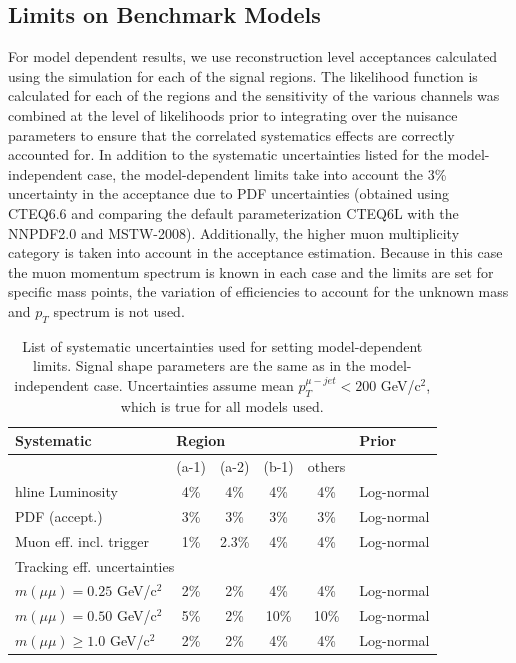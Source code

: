 \subsection{Limits on Benchmark Models}

For model dependent results, we use reconstruction level acceptances calculated using the simulation for each of the signal regions. The likelihood function is calculated for each of the regions and the sensitivity of the various channels was combined at the level of likelihoods prior to integrating over the nuisance parameters to ensure that the correlated systematics effects are correctly accounted for. In addition to the systematic uncertainties listed for the model-independent case, the model-dependent limits take into account the 3\% uncertainty in the acceptance due to PDF uncertainties (obtained using CTEQ6.6 and comparing the default parameterization CTEQ6L with the NNPDF2.0 and MSTW-2008). Additionally, the higher muon multiplicity category is taken into account in the acceptance estimation. Because in this case the muon momentum spectrum is known in each case and the limits are set for specific mass points, the variation of efficiencies to account for the unknown mass and $p_T$ spectrum is not used.

\begin{table}[tbh]
\caption{List of systematic uncertainties used for setting model-dependent limits. Signal shape parameters
are the same as in the model-independent case. Uncertainties assume mean $p_T^{\mu-jet}<200$ GeV/c$^2$,
which is true for all models used. \label{tab:syst_params_model_dependent}}
\begin{center}
\begin{tabular}{| l | cccc|l|}
\hline\hline 
Systematic & \multicolumn{4}{|l|}{Region}              & Prior \\\hline
                  & (a-1) & (a-2) & (b-1) & others & \\hline
Luminosity  & 4\%  & 4\% & 4\%  & 4\%     & Log-normal \\
PDF (accept.) & 3\%  & 3\% & 3\%  & 3\%      & Log-normal \\
Muon eff. incl. trigger & 1\%& 2.3\%& 4\% & 4\% & Log-normal \\\hline
\multicolumn{4}{|l|}{Tracking eff. uncertainties}  \\
$m(\mu\mu)=0.25$ GeV/c$^2$   & 2\% & 2\% & 4\%   & 4\%   & Log-normal \\
$m(\mu\mu)=0.50$ GeV/c$^2$   & 5\% & 2\% & 10\% & 10\%  & Log-normal \\
$m(\mu\mu)\geq1.0$ GeV/c$^2$ & 2\% & 2\% & 4\%  & 4\%   & Log-normal \\
\hline\hline 
\end{tabular}
\end{center}
\end{table}


